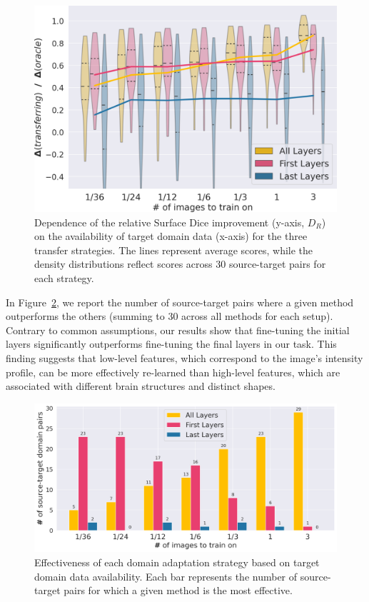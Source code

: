 \begin{figure}[h!]
	\includegraphics[width=\linewidth]{Dissertation/Figures/2_mri/gap.png}
	\caption{Dependence of the relative Surface Dice improvement (y-axis, $D_R$) on the availability of target domain data (x-axis) for the three transfer strategies. The lines represent average scores, while the density distributions reflect scores across 30 source-target pairs for each strategy.}
	\label{fig:gap}
\end{figure}

In Figure~\ref{fig:winners}, we report the number of source-target pairs where a given method outperforms the others (summing to 30 across all methods for each setup). Contrary to common assumptions, our results show that fine-tuning the initial layers significantly outperforms fine-tuning the final layers in our task. This finding suggests that low-level features, which correspond to the image's intensity profile, can be more effectively re-learned than high-level features, which are associated with different brain structures and distinct shapes.

\begin{figure}[h]
	\includegraphics[width=\linewidth]{Dissertation/Figures/2_mri/winners_1.png}
	\caption{Effectiveness of each domain adaptation strategy based on target domain data availability. Each bar represents the number of source-target pairs for which a given method is the most effective.}
	\label{fig:winners}
\end{figure}


